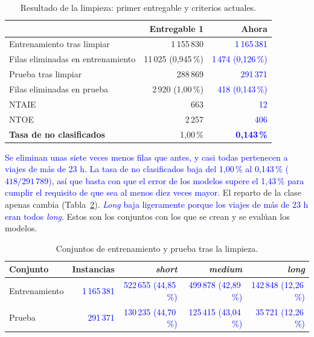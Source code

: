 \documentclass[12pt,a4paper]{article}
\newcommand{\cambio}[1]{\textcolor{blue}{#1}}
\begin{document}
\begin{table}[H]
\centering
\small
\begin{tabular}{lrr}
\toprule
 & \textbf{Entregable 1} & \textbf{Ahora} \\
\midrule
Entrenamiento tras limpiar & 1\,155\,830 & \cambio{1\,165\,381} \\
Filas eliminadas en entrenamiento & 11\,025 (0,945\,\%) & \cambio{1\,474 (0,126\,\%)} \\
Prueba tras limpiar & 288\,869 & \cambio{291\,371} \\
Filas eliminadas en prueba & 2\,920 (1,00\,\%) & \cambio{418 (0,143\,\%)} \\
\quad \acs{NTAIE} & 663 & \cambio{12} \\
\quad \acs{NTOE} & 2\,257 & \cambio{406} \\
\midrule
\textbf{Tasa de no clasificados} & 1,00\,\% & \cambio{\textbf{0,143\,\%}} \\
\bottomrule
\end{tabular}
\caption{Resultado de la limpieza: primer entregable y criterios actuales.}
\label{tab:limpieza}
\end{table}

\cambio{Se eliminan unas siete veces menos filas que antes, y casi todas pertenecen a viajes de más de 23 h. La tasa de no clasificados baja del 1,00\,\% al 0,143\,\% ($418 / 291\,789$), así que basta con que el error de los modelos supere el 1,43\,\% para cumplir el requisito de que sea al menos diez veces mayor.} El reparto de la clase apenas cambia (Tabla~\ref{tab:conjuntos-limpios}).
\cambio{\textit{Long} baja ligeramente porque los viajes de más de 23 h eran
todos \textit{long}.} Estos son los conjuntos con los que se crean y se
evalúan los modelos.
 
\begin{table}[H]
\centering
\small
\begin{tabular}{lrrrr}
\toprule
\textbf{Conjunto} & \textbf{Instancias} & \textbf{\textit{short}} & \textbf{\textit{medium}} & \textbf{\textit{long}} \\
\midrule
Entrenamiento & \cambio{1\,165\,381} & \cambio{522\,655 (44,85\,\%)} & \cambio{499\,878 (42,89\,\%)} & \cambio{142\,848 (12,26\,\%)} \\
Prueba        & \cambio{291\,371}   & \cambio{130\,235 (44,70\,\%)} & \cambio{125\,415 (43,04\,\%)} & \cambio{35\,721 (12,26\,\%)} \\
\bottomrule
\end{tabular}
\caption{Conjuntos de entrenamiento y prueba tras la limpieza.}
\label{tab:conjuntos-limpios}
\end{table}
\end{document}
